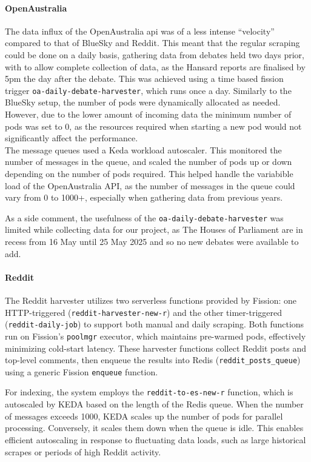 \documentclass[]{article}
\numberwithin{equation}{section}
\begin{document}
\paragraph*{OpenAustralia} 
The data influx of the OpenAustralia api was of a less intense ``velocity'' compared to that of BlueSky and Reddit.
This meant that the regular scraping could be done on a daily basis, gathering data from debates held two days prior, with to allow complete collection of data, as the Hansard reports are finalised by 5pm the day after the debate.
This was achieved using a time based fission trigger \texttt{oa-daily-debate-harvester}, which runs once a day.
Similarly to the BlueSky setup, the number of pods were dynamically allocated as needed. However, due to the lower amount of incoming data the minimum number of pods was set to 0, as the resources required when starting a new pod would not significantly affect the performance.
\\
The message queues used a Keda workload autoscaler.
This monitored the number of messages in the queue, and scaled the number of pods up or down depending on the number of pods required.
This helped handle the variabible load of the OpenAustralia API, as the number of messages in the queue could vary from 0 to 1000+, especially when gathering data from previous years. 

As a side comment, the usefulness of the \texttt{oa-daily-debate-harvester} was limited while collecting data for our project, as The Houses of Parliament are in recess from 16 May until 25 May 2025 and so no new debates were available to add.

\paragraph*{Reddit}

The Reddit harvester utilizes two serverless functions provided by Fission: one HTTP-triggered (\texttt{reddit-harvester-new-r}) and the other timer-triggered (\texttt{reddit-daily-job}) to support both manual and daily scraping. Both functions run on Fission's \texttt{poolmgr} executor, which maintains pre-warmed pods, effectively minimizing cold-start latency. These harvester functions collect Reddit posts and top-level comments, then enqueue the results into Redis (\texttt{reddit\_posts\_queue}) using a generic Fission \texttt{enqueue} function.

For indexing, the system employs the \texttt{reddit-to-es-new-r} function, which is autoscaled by KEDA based on the length of the Redis queue. When the number of messages exceeds 1000, KEDA scales up the number of pods for parallel processing. Conversely, it scales them down when the queue is idle. This enables efficient autoscaling in response to fluctuating data loads, such as large historical scrapes or periods of high Reddit activity.
\end{document}
